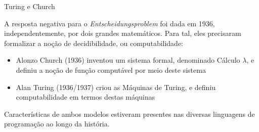 \begin{frame}[fragile]{Turing e Church}

    A resposta negativa para o \textit{Entscheidungsproblem} foi dada em 1936, independentemente,
    por dois grandes matemáticos. Para tal, eles precisaram formalizar a noção de 
    decidibilidade, ou computabilidade:

    \vspace{0.2in}

    \begin{itemize}
        \item Alonzo Church (1936) inventou um sistema formal, denominado Cálculo $\lambda$,
            e definiu a noção de função computável por meio deste sistema
        \item Alan Turing (1936/1937) criou as Máquinas de Turing, e definiu computabilidade em termos
            destas máquinas
    \end{itemize}

    \vspace{0.2in}

    Características de ambos modelos estiveram presentes nas diversas linguagens de programação
    ao longo da história.

\end{frame}
